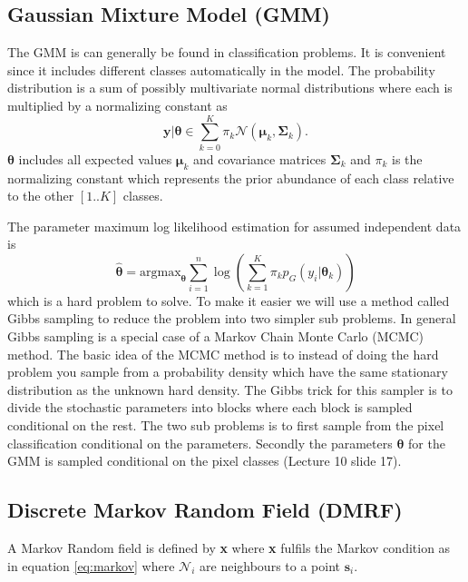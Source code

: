 \documentclass[a4paper,english]{article}
\begin{document}
\subsection{Gaussian Mixture Model (GMM)}
The GMM is can generally be found in classification problems.
It is convenient since it includes different classes automatically in the model.
The probability distribution is a sum of possibly multivariate normal distributions where each is multiplied by a normalizing constant as
\begin{equation}
  \boldsymbol{y} | \boldsymbol{\theta} \in \sum_{k = 0}^K \pi_k \mathcal{N}(\boldsymbol{\mu}_k, \boldsymbol{\Sigma}_k).
  \label{eq:gmm}
\end{equation}
$\boldsymbol{\theta}$ includes all expected values $\boldsymbol{\mu}_k$ and covariance matrices $\boldsymbol{\Sigma}_k$ and $\pi_k$ is the normalizing constant which represents the prior abundance of each class relative to the other $[1..K]$ classes.

The parameter maximum log likelihood estimation for assumed independent data is
\begin{equation}
  \hat{\boldsymbol{\theta}} = \text{argmax}_{\boldsymbol{\theta}} \sum_{i = 1}^n \log \left(  \sum_{k=1}^K \pi_k p_G(y_i | \boldsymbol{\theta}_k) \right)
\end{equation}
which is a hard problem to solve.
To make it easier we will use a method called Gibbs sampling to reduce the problem into two simpler sub problems.
In general Gibbs sampling is a special case of a Markov Chain Monte Carlo (MCMC) method.
The basic idea of the MCMC method is to instead of doing the hard problem you sample from a probability density which have the same stationary distribution as the unknown hard density.
The Gibbs trick for this sampler is to divide the stochastic parameters into blocks where each block is sampled conditional on the rest.
The two sub problems is to first sample from the pixel classification conditional on the parameters.
Secondly the parameters $\boldsymbol{\theta}$ for the GMM is sampled conditional on the pixel classes (Lecture 10 slide 17\cite{L10}).

\subsection{Discrete Markov Random Field (DMRF)}

A Markov Random field is defined by \textbf{x} where \textbf{x} fulfils the Markov condition as in equation \ref{eq:markov} where $\mathcal{N}_i$ are neighbours to a point $\textbf{s}_i$.
\end{document}
